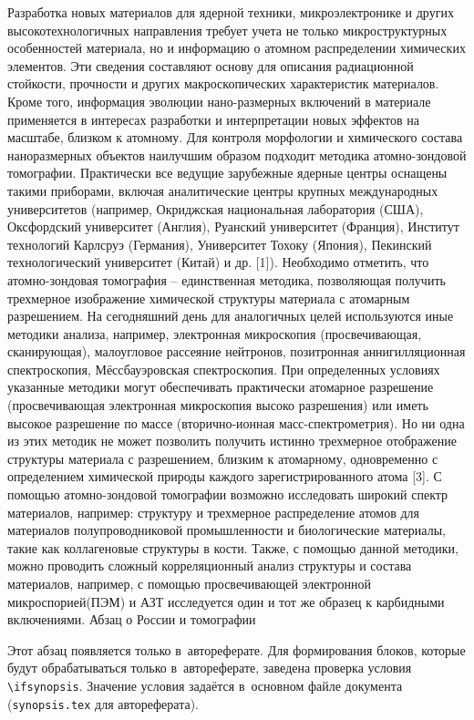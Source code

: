 
{\actuality} Разработка новых материалов для ядерной техники, микроэлектронике и других высокотехнологичных направления требует учета не только микроструктурных особенностей материала, но и информацию о атомном распределении химических элементов. Эти сведения составляют основу для описания радиационной стойкости, прочности и других макроскопических характеристик материалов. Кроме того, информация эволюции нано-размерных включений в материале применяется в интересах разработки и интерпретации новых эффектов на масштабе, близком к атомному.
Для контроля морфологии и химического состава наноразмерных объектов наилучшим образом подходит методика атомно-зондовой томографии. Практически все ведущие зарубежные ядерные центры оснащены такими приборами, включая аналитические центры крупных международных университетов (например, Окриджская национальная лаборатория (США), Оксфордский университет (Англия), Руанский университет (Франция), Институт технологий Карлсруэ (Германия), Университет Тохоку (Япония), Пекинский технологический университет (Китай) и др. [1]). Необходимо отметить, что атомно-зондовая томография – единственная методика, позволяющая получить трехмерное изображение химической структуры материала с атомарным разрешением. На сегодняшний день для аналогичных целей используются иные методики анализа, например, электронная микроскопия (просвечивающая, сканирующая), малоугловое рассеяние нейтронов, позитронная аннигилляционная спектроскопия, Мёссбауэровская спектроскопия. При определенных условиях указанные методики могут обеспечивать практически атомарное разрешение (просвечивающая электронная микроскопия высоко разрешения) или иметь высокое разрешение по массе (вторично-ионная масс-спектрометрия). Но ни одна из этих методик не может позволить получить истинно трехмерное отображение структуры материала с разрешением, близким к атомарному, одновременно с определением химической природы каждого зарегистрированного атома [3]. С помощью атомно-зондовой томографии возможно исследовать широкий спектр материалов, например: структуру и трехмерное распределение атомов для материалов полупроводниковой промышленности\cite{Ulfig23} и биологические материалы, такие как коллагеновые структуры в кости\cite{Lee21}. Также, с помощью данной методики, можно проводить сложный корреляционный анализ структуры и состава материалов, например, с помощью просвечивающей электронной микроспорией(ПЭМ) и АЗТ исследуется один и тот же образец к карбидными включениями\cite{Liebscher18}.
Абзац о России и томографии

\ifsynopsis
Этот абзац появляется только в~автореферате.
Для формирования блоков, которые будут обрабатываться только в~автореферате,
заведена проверка условия \verb!\!\verb!ifsynopsis!.
Значение условия задаётся в~основном файле документа (\verb!synopsis.tex! для
автореферата).
\else
\fi

